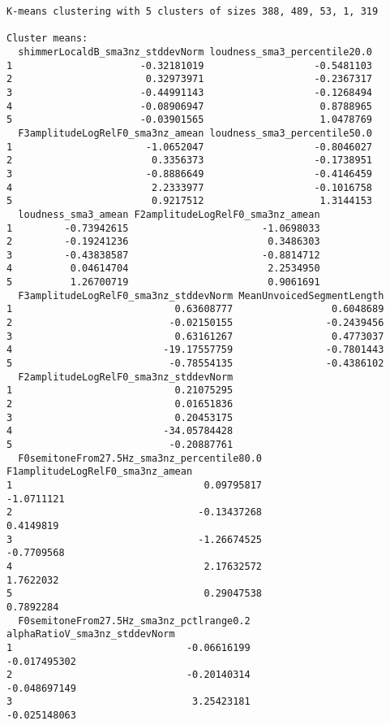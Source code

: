 \documentclass[
  letterpaper,
  DIV=11,
  numbers=noendperiod]{scrartcl}
\begin{document}
\begin{verbatim}
K-means clustering with 5 clusters of sizes 388, 489, 53, 1, 319

Cluster means:
  shimmerLocaldB_sma3nz_stddevNorm loudness_sma3_percentile20.0
1                      -0.32181019                   -0.5481103
2                       0.32973971                   -0.2367317
3                      -0.44991143                   -0.1268494
4                      -0.08906947                    0.8788965
5                      -0.03901565                    1.0478769
  F3amplitudeLogRelF0_sma3nz_amean loudness_sma3_percentile50.0
1                       -1.0652047                   -0.8046027
2                        0.3356373                   -0.1738951
3                       -0.8886649                   -0.4146459
4                        2.2333977                   -0.1016758
5                        0.9217512                    1.3144153
  loudness_sma3_amean F2amplitudeLogRelF0_sma3nz_amean
1         -0.73942615                       -1.0698033
2         -0.19241236                        0.3486303
3         -0.43838587                       -0.8814712
4          0.04614704                        2.2534950
5          1.26700719                        0.9061691
  F3amplitudeLogRelF0_sma3nz_stddevNorm MeanUnvoicedSegmentLength
1                            0.63608777                 0.6048689
2                           -0.02150155                -0.2439456
3                            0.63161267                 0.4773037
4                          -19.17557759                -0.7801443
5                           -0.78554135                -0.4386102
  F2amplitudeLogRelF0_sma3nz_stddevNorm
1                            0.21075295
2                            0.01651836
3                            0.20453175
4                          -34.05784428
5                           -0.20887761
  F0semitoneFrom27.5Hz_sma3nz_percentile80.0 F1amplitudeLogRelF0_sma3nz_amean
1                                 0.09795817                       -1.0711121
2                                -0.13437268                        0.4149819
3                                -1.26674525                       -0.7709568
4                                 2.17632572                        1.7622032
5                                 0.29047538                        0.7892284
  F0semitoneFrom27.5Hz_sma3nz_pctlrange0.2 alphaRatioV_sma3nz_stddevNorm
1                              -0.06616199                  -0.017495302
2                              -0.20140314                  -0.048697149
3                               3.25423181                  -0.025148063

\end{verbatim}
\end{document}
